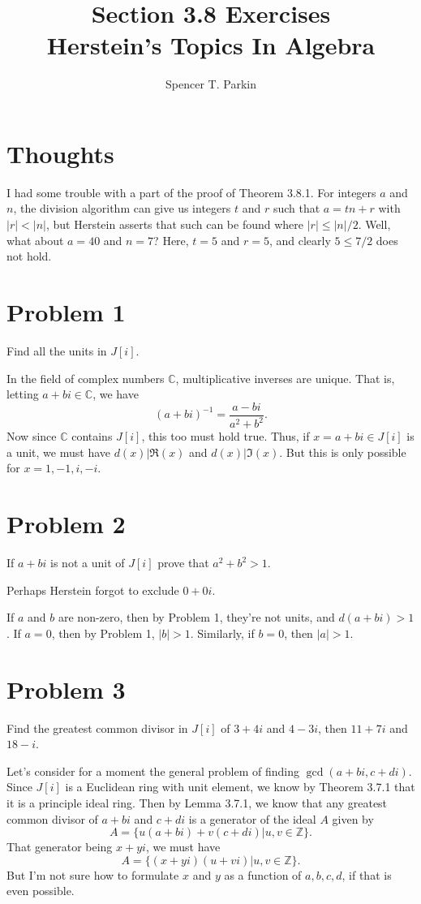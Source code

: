 \documentclass[12pt]{article}
\title{Section 3.8 Exercises\\Herstein's Topics In Algebra}
\author{Spencer T. Parkin}
\newcommand{\Z}{\mathbb{Z}}
\newcommand{\C}{\mathbb{C}}
\begin{document}
\maketitle

\section*{Thoughts}

I had some trouble with a part of the proof of Theorem 3.8.1.
For integers $a$ and $n$, the division algorithm can give us integers
$t$ and $r$ such that $a=tn+r$ with $|r|<|n|$, but Herstein asserts
that such can be found where $|r|\leq |n|/2$.  Well, what about $a=40$
and $n=7$?  Here, $t=5$ and $r=5$, and clearly $5\leq 7/2$ does not hold.

\section*{Problem 1}

Find all the units in $J[i]$.

In the field of complex numbers $\C$, multiplicative inverses are unique.
That is, letting $a+bi\in\C$, we have
\begin{equation*}
(a+bi)^{-1}=\frac{a-bi}{a^2+b^2}.
\end{equation*}
Now since $\C$ contains $J[i]$, this too must hold true.  Thus, if $x=a+bi\in J[i]$ is a unit,
we must have $d(x)|\Re(x)$ and $d(x)|\Im(x)$.  But this is only possible for $x=1,-1,i,-i$.

\section*{Problem 2}

If $a+bi$ is not a unit of $J[i]$ prove that $a^2+b^2>1$.

Perhaps Herstein forgot to exclude $0+0i$.

If $a$ and $b$ are non-zero, then by Problem 1, they're not units, and $d(a+bi)>1$.
If $a=0$, then by Problem 1, $|b|>1$.  Similarly, if $b=0$, then $|a|>1$.

\section*{Problem 3}

Find the greatest common divisor in $J[i]$ of $3+4i$ and $4-3i$, then $11+7i$ and $18-i$.

Let's consider for a moment the general problem of finding $\gcd(a+bi,c+di)$.
Since $J[i]$ is a Euclidean ring with unit element, we know by Theorem 3.7.1 that it is a principle ideal ring.
Then by Lemma 3.7.1, we know that any greatest common divisor of $a+bi$ and $c+di$ is a generator
of the ideal $A$ given by
\begin{equation*}
A=\{u(a+bi)+v(c+di)|u,v\in\Z\}.
\end{equation*}
That generator being $x+yi$, we must have
\begin{equation*}
A=\{(x+yi)(u+vi)|u,v\in\Z\}.
\end{equation*}
But I'm not sure how to formulate $x$ and $y$ as a
function of $a,b,c,d$, if that is even possible.
\end{document}
